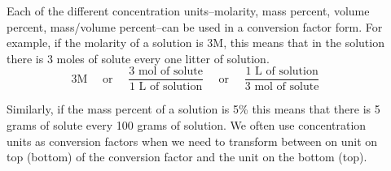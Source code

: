 \documentclass[main.tex]{subfiles} %
\begin{document}
\begin{description}

\item[] Each of the different concentration units--molarity, mass percent, volume percent, mass/volume percent--can be used in a conversion factor form. For example, if the molarity of a solution is 3M, this means that in the solution there is 3 moles of solute every one litter of solution. 
\begin{equation*}
\boxed{   \text{3M}\quad\text{ or }\quad \frac{3\text{ mol of solute}}{1\text{ L of solution}}\quad\text{ or }\quad   \frac{1\text{ L of solution}}{3\text{ mol of solute}}}   
\end{equation*}

Similarly, if the mass percent of a solution is 5\% this means that there is 5 grams of solute every 100 grams of solution. We often use concentration units as conversion factors when we need to transform between on unit on top (bottom) of the conversion factor and the unit on the bottom (top). 




\end{description}
\end{document}
